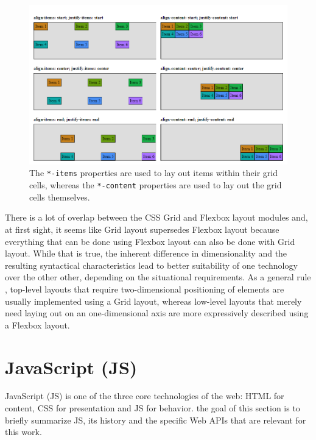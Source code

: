 \begin{figure}[tp]
    \centering
    \includegraphics[keepaspectratio,width=\linewidth,height=\fullh / 2]
    {images/grid-layout-properties.png}

    \caption[Grid Layout Property Comparision]{
        The \lstinline{*-items} properties are used to lay out items within their grid cells, whereas the \lstinline{*-content} properties are used to lay out the grid cells themselves.
    }
    \label{fig:GridLayoutProperties}
\end{figure}

There is a lot of overlap between the CSS Grid and Flexbox layout modules and, at first sight, it seems like Grid layout supersedes Flexbox layout because everything that can be done using Flexbox layout can also be done with Grid layout. While that is true, the inherent difference in dimensionality and the resulting syntactical characteristics lead to better suitability of one technology over the other other, depending on the situational requirements. As a general rule \parencite{CSSGridVsFlexbox}, top-level layouts that require two-dimensional positioning of elements are usually implemented using a Grid layout, whereas low-level layouts that merely need laying out on an one-dimensional axis are more expressively described using a Flexbox layout.

\section{JavaScript (JS)}

JavaScript (JS) is one of the three core technologies of the web: HTML for content, CSS for presentation and JS for behavior. the goal of this section is to briefly summarize JS, its history and the specific Web APIs that are relevant for this work.

